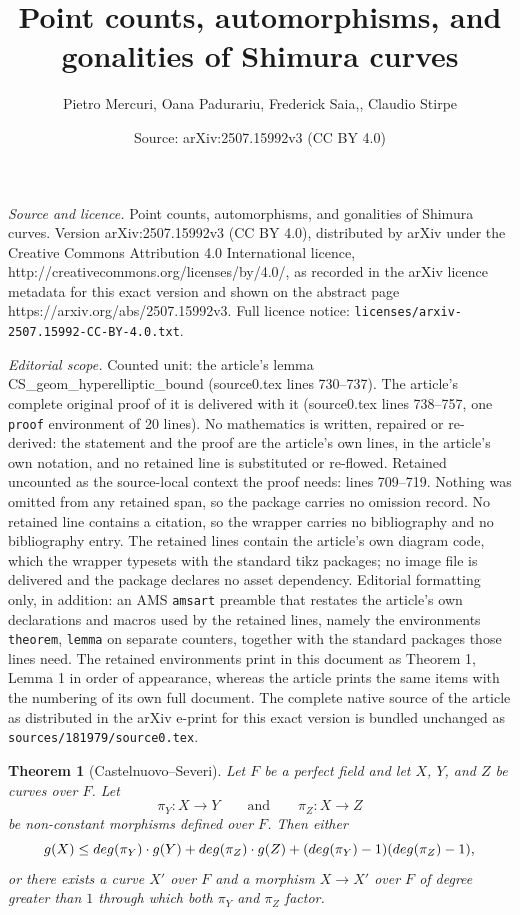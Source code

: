 \documentclass[10pt,a4paper]{amsart}
\title{Point counts, automorphisms, and gonalities of Shimura curves}
\author{Pietro Mercuri, Oana Padurariu, Frederick Saia,, Claudio Stirpe}
\date{Source: arXiv:2507.15992v3 (CC BY 4.0)}
\newtheorem{theorem}{Theorem}
\begin{document}
\maketitle

\noindent\emph{Source and licence.} Point counts, automorphisms, and gonalities of Shimura curves. Version arXiv:2507.15992v3 (CC BY 4.0), distributed by arXiv under the Creative Commons Attribution 4.0 International licence, http://creativecommons.org/licenses/by/4.0/, as recorded in the arXiv licence metadata for this exact version and shown on the abstract page https://arxiv.org/abs/2507.15992v3. Full licence notice: \texttt{licenses/arxiv-2507.15992-CC-BY-4.0.txt}.\par\smallskip

\noindent\textit{Editorial scope.} Counted unit: the article's lemma CS\_geom\_hyperelliptic\_bound (source0.tex lines 730--737). The article's complete original proof of it is delivered with it (source0.tex lines 738--757, one \texttt{proof} environment of 20 lines). No mathematics is written, repaired or re-derived: the statement and the proof are the article's own lines, in the article's own notation, and no retained line is substituted or re-flowed.  Retained uncounted as the source-local context the proof needs: lines 709--719.  Nothing was omitted from any retained span, so the package carries no omission record.  No retained line contains a citation, so the wrapper carries no bibliography and no bibliography entry.  The retained lines contain the article's own diagram code, which the wrapper typesets with the standard tikz packages; no image file is delivered and the package declares no asset dependency.  Editorial formatting only, in addition: an AMS \texttt{amsart} preamble that restates the article's own declarations and macros used by the retained lines, namely the environments \texttt{theorem}, \texttt{lemma} on separate counters, together with the standard packages those lines need.  The retained environments print in this document as Theorem 1, Lemma 1 in order of appearance, whereas the article prints the same items with the numbering of its own full document.  The complete native source of the article as distributed in the arXiv e-print for this exact version is bundled unchanged as \texttt{sources/181979/source0.tex}.
\begin{theorem}[Castelnuovo--Severi]\label{theorem: CS}
Let $F$ be a perfect field and let $X$, $Y$, and $Z$ be curves over $F$. Let
\[
\pi_Y\colon X \to Y\qquad\text{and} \qquad \pi_Z\colon X \to Z
\]
be non-constant morphisms defined over $F$. Then either
\[
g(X) \leq \textnormal{deg}(\pi_Y)\cdot g(Y) + \textnormal{deg}(\pi_Z)\cdot g(Z) + (\textnormal{deg}(\pi_Y)-1)(\textnormal{deg}(\pi_Z)-1),
\]
or there exists a curve $X'$ over $F$ and a morphism $X \to X'$ over $F$ of degree greater than $1$ through which both $\pi_Y$ and $\pi_Z$ factor. 
\end{theorem}
\end{document}
